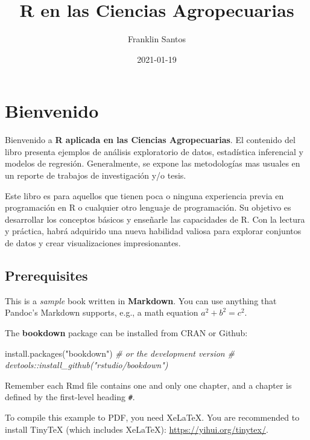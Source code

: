\documentclass[
]{book}
\title{R en las Ciencias Agropecuarias}
\author{Franklin Santos}
\date{2021-01-19}
\newenvironment{Shaded}{\begin{snugshade}}{\end{snugshade}}
\newcommand{\CommentTok}[1]{\textcolor[rgb]{0.56,0.35,0.01}{\textit{#1}}}
\newcommand{\FunctionTok}[1]{\textcolor[rgb]{0.00,0.00,0.00}{#1}}
\newcommand{\NormalTok}[1]{#1}
\newcommand{\StringTok}[1]{\textcolor[rgb]{0.31,0.60,0.02}{#1}}
\begin{document}
\maketitle

{
\setcounter{tocdepth}{1}
\tableofcontents
}
\hypertarget{bienvenido}{%
\chapter*{Bienvenido}\label{bienvenido}}

Bienvenido a \textbf{R aplicada en las Ciencias Agropecuarias}. El contenido del libro presenta ejemplos de análisis exploratorio de datos, estadística inferencial y modelos de regresión. Generalmente, se expone las metodologías mas usuales en un reporte de trabajos de investigación y/o tesis.

Este libro es para aquellos que tienen poca o ninguna experiencia previa en programación en R o cualquier otro lenguaje de programación. Su objetivo es desarrollar los conceptos básicos y enseñarle las capacidades de R. Con la lectura y práctica, habrá adquirido una nueva habilidad valiosa para explorar conjuntos de datos y crear visualizaciones impresionantes.

\hypertarget{prerequisites}{%
\section{Prerequisites}\label{prerequisites}}

This is a \emph{sample} book written in \textbf{Markdown}. You can use anything that Pandoc's Markdown supports, e.g., a math equation \(a^2 + b^2 = c^2\).

The \textbf{bookdown} package can be installed from CRAN or Github:

\begin{Shaded}
\begin{Highlighting}[]
\FunctionTok{install.packages}\NormalTok{(}\StringTok{"bookdown"}\NormalTok{)}
\CommentTok{\# or the development version}
\CommentTok{\# devtools::install\_github("rstudio/bookdown")}
\end{Highlighting}
\end{Shaded}

Remember each Rmd file contains one and only one chapter, and a chapter is defined by the first-level heading \texttt{\#}.

To compile this example to PDF, you need XeLaTeX. You are recommended to install TinyTeX (which includes XeLaTeX): \url{https://yihui.org/tinytex/}.
\end{document}
